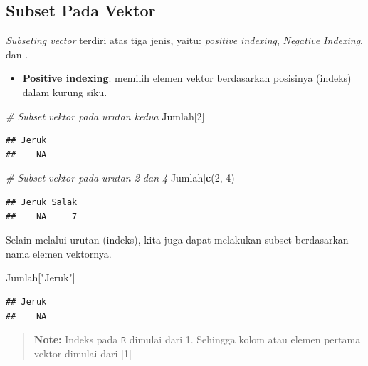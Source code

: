 \documentclass[]{book}
\newenvironment{Shaded}{\begin{snugshade}}{\end{snugshade}}
\newcommand{\KeywordTok}[1]{\textcolor[rgb]{0.13,0.29,0.53}{\textbf{#1}}}
\newcommand{\DecValTok}[1]{\textcolor[rgb]{0.00,0.00,0.81}{#1}}
\newcommand{\StringTok}[1]{\textcolor[rgb]{0.31,0.60,0.02}{#1}}
\newcommand{\CommentTok}[1]{\textcolor[rgb]{0.56,0.35,0.01}{\textit{#1}}}
\newcommand{\NormalTok}[1]{#1}
\providecommand{\tightlist}{%
  \setlength{\itemsep}{0pt}\setlength{\parskip}{0pt}}
\begin{document}
\subsection{Subset Pada Vektor}\label{subset-pada-vektor}

\emph{Subseting vector} terdiri atas tiga jenis, yaitu: \emph{positive
indexing}, \emph{Negative Indexing}, dan .

\begin{itemize}
\tightlist
\item
  \textbf{Positive indexing}: memilih elemen vektor berdasarkan
  posisinya (indeks) dalam kurung siku.
\end{itemize}

\begin{Shaded}
\begin{Highlighting}[]
\CommentTok{# Subset vektor pada urutan kedua}
\NormalTok{Jumlah[}\DecValTok{2}\NormalTok{]}
\end{Highlighting}
\end{Shaded}

\begin{verbatim}
## Jeruk 
##    NA
\end{verbatim}

\begin{Shaded}
\begin{Highlighting}[]
\CommentTok{# Subset vektor pada urutan 2 dan 4}
\NormalTok{Jumlah[}\KeywordTok{c}\NormalTok{(}\DecValTok{2}\NormalTok{, }\DecValTok{4}\NormalTok{)]}
\end{Highlighting}
\end{Shaded}

\begin{verbatim}
## Jeruk Salak 
##    NA     7
\end{verbatim}

Selain melalui urutan (indeks), kita juga dapat melakukan subset
berdasarkan nama elemen vektornya.

\begin{Shaded}
\begin{Highlighting}[]
\NormalTok{Jumlah[}\StringTok{"Jeruk"}\NormalTok{]}
\end{Highlighting}
\end{Shaded}

\begin{verbatim}
## Jeruk 
##    NA
\end{verbatim}

\begin{quote}
\textbf{Note: } Indeks pada \texttt{R} dimulai dari 1. Sehingga kolom
atau elemen pertama vektor dimulai dari {[}1{]}
\end{quote}
\end{document}
